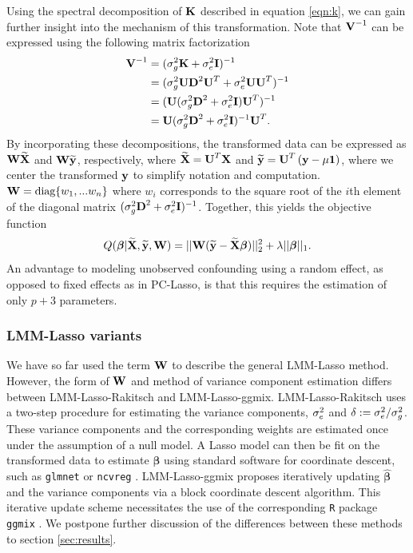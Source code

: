 Using the spectral decomposition of $\textbf{K}$ described in equation \eqref{eqn:k}, we can gain further insight into the mechanism of this transformation. Note that $\textbf{V}^{-1}$ can be expressed using the following matrix factorization 
\begin{align*}
    \textbf{V}^{-1} &= (\sigma^2_g \textbf{K} + \sigma^2_e \textbf{I})^{-1}\\
    &=(\sigma^2_g \textbf{U} \textbf{D}^2 \textbf{U}^T + \sigma^2_e \textbf{U} \textbf{U}^T)^{-1}\\
    &= (\textbf{U} (\sigma^2_g \textbf{D}^2 + \sigma^2_e \textbf{I}) \textbf{U}^T)^{-1}\\
    &=\textbf{U} (\sigma^2_g \textbf{D}^2 + \sigma^2_e \textbf{I})^{-1} \textbf{U}^T.
\end{align*}
By incorporating these decompositions, the transformed data can be expressed as $\textbf{W} \widetilde{\textbf{X}}$ and $\textbf{W} \widetilde{\textbf{y}}$, respectively, where $\widetilde{\textbf{X}} = \textbf{U}^T \textbf{X}$ and $\widetilde{\textbf{y}} = \textbf{U}^T \left(\textbf{y} - \mu \textbf{1} \right)$, where we center the transformed $\textbf{y}$ to simplify notation and computation.  $\textbf{W} = \text{diag}\{w_1, ... w_n\}$ where $w_i$ corresponds to the square root of the $i$th element of the diagonal matrix $(\sigma^2_g \textbf{D}^2 + \sigma^2_e \textbf{I})^{-1}$. Together, this yields the objective function
\begin{equation}
\label{eqn:lmm_obj}
Q(\boldsymbol{\beta} | \widetilde{\textbf{X}}, \widetilde{\textbf{y}}, \textbf{W}) = || \textbf{W} (\widetilde{\textbf{y}} - \widetilde{\textbf{X}} \boldsymbol{\beta})||_2^2 + \lambda || \boldsymbol{\beta} ||_1.
\end{equation}
An advantage to modeling unobserved confounding using a random effect, as opposed to fixed effects as in PC-Lasso, is that this requires the estimation of only $p + 3$ parameters. 



\subsubsection{LMM-Lasso variants}
\label{sec:rak-ggmix}

We have so far used the term $\textbf{W}$ to describe the general LMM-Lasso method. However, the form of $\textbf{W}$ and method of variance component estimation differs between LMM-Lasso-Rakitsch and LMM-Lasso-ggmix. LMM-Lasso-Rakitsch \citep{Rakitsch2012} uses a two-step procedure for estimating the variance components, $\sigma^2_e$ and $\delta := \sigma^2_e / \sigma^2_g$. These variance components and the corresponding weights are estimated once under the assumption of a null model. A Lasso model can then be fit on the transformed data to estimate $\boldsymbol{\beta}$ using standard software for coordinate descent, such as \texttt{glmnet} \citep{glmnet} or \texttt{ncvreg} \citep{ncvreg}. LMM-Lasso-ggmix \citep{bhatnagar2019simultaneous} proposes iteratively updating $\widehat{\boldsymbol{\beta}}$ and the variance components via a block coordinate descent algorithm. This iterative update scheme necessitates the use of the corresponding \texttt{R} package \texttt{ggmix} \citep{ggmix, bhatnagar2019simultaneous}. We postpone further discussion of the differences between these methods to section \ref{sec:results}.

